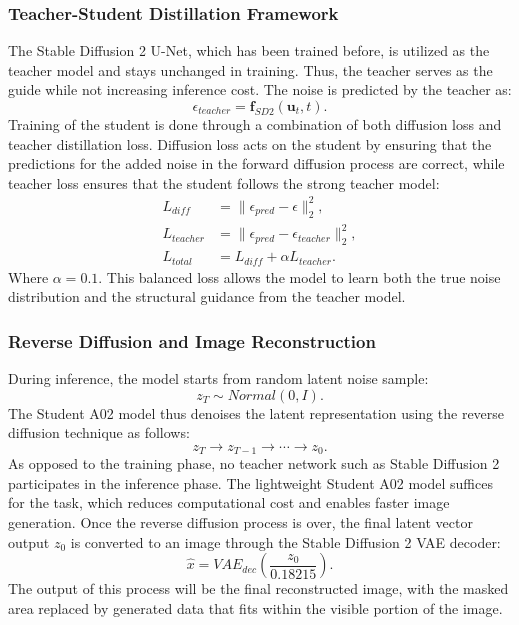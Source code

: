 \documentclass[journal]{IEEEtran}
\begin{document}
\subsubsection{Teacher-Student Distillation Framework}
The Stable Diffusion 2 U-Net, which has been trained before, is utilized as the teacher model and stays unchanged in training. Thus, the teacher serves as the guide while not increasing inference cost. The noise is predicted by the teacher as:
\begin{equation}
\epsilon_{teacher}=\mathbf{f}_{SD2}(\mathbf{u}_t,t).
\end{equation}
Training of the student is done through a combination of both diffusion loss and teacher distillation loss. Diffusion loss acts on the student by ensuring that the predictions for the added noise in the forward diffusion process are correct, while teacher loss ensures that the student follows the strong teacher model:
\begin{align}
L_{diff}&=\lVert\epsilon_{pred}-\epsilon\rVert_2^2,\\
L_{teacher}&=\lVert\epsilon_{pred}-\epsilon_{teacher}\rVert_2^2,\\
L_{total}&=L_{diff}+\alpha L_{teacher}.
\end{align}
Where $\alpha=0.1$. This balanced loss allows the model to learn both the true noise distribution and the structural guidance from the teacher model.

\subsubsection{Reverse Diffusion and Image Reconstruction}
During inference, the model starts from random latent noise sample:
\begin{equation}
z_T\sim Normal(0,I).
\end{equation}
The Student A02 model thus denoises the latent representation using the reverse diffusion technique as follows:
\begin{equation}
z_T\rightarrow z_{T-1}\rightarrow\cdots\rightarrow z_0.
\end{equation}
As opposed to the training phase, no teacher network such as Stable Diffusion 2 participates in the inference phase. The lightweight Student A02 model suffices for the task, which reduces computational cost and enables faster image generation. Once the reverse diffusion process is over, the final latent vector output $z_0$ is converted to an image through the Stable Diffusion 2 VAE decoder:
\begin{equation}
\hat{x}=VAE_{dec}\left(\frac{z_0}{0.18215}\right).
\end{equation}
The output of this process will be the final reconstructed image, with the masked area replaced by generated data that fits within the visible portion of the image.
\end{document}

